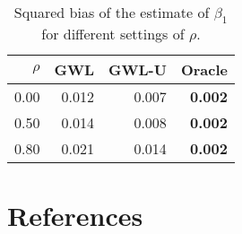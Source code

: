 \documentclass[authoryear, review, 11pt]{elsarticle}
\begin{document}
\begin{table}[ht]
\begin{center}
\begin{tabular}{rrrr}
 $\rho$ & GWL & GWL-U & Oracle \\ 
  \hline
0.00 & 0.012 & 0.007 & \textbf{0.002} \\ 
  0.50 & 0.014 & 0.008 & \textbf{0.002} \\ 
  0.80 & 0.021 & 0.014 & \textbf{0.002} \\ 
  \end{tabular}
\caption{Squared bias of the estimate of $\beta_1$ for different settings of $\rho$.}
\end{center}
\end{table}



\section{References}


\end{document}
